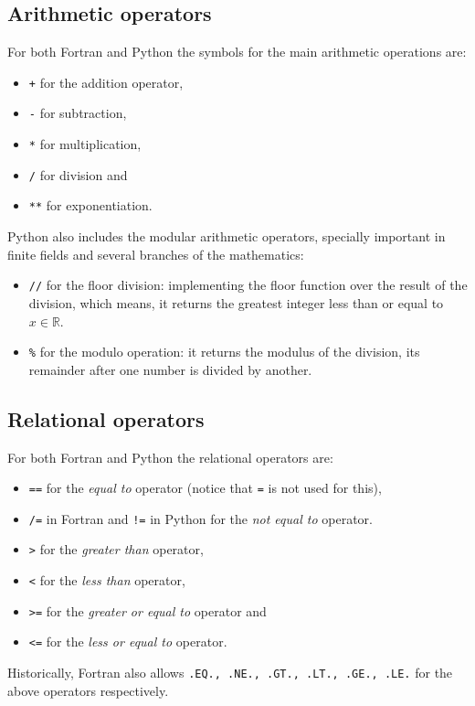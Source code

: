         \subsection*{Arithmetic operators}
        
        For both Fortran and Python the symbols for the main arithmetic operations are:
        \vspace{-0.5cm}
        \begin{itemize}[noitemsep]
            \item \texttt{+} for the addition operator, 
            \item \texttt{-} for subtraction,
            \item \texttt{*} for multiplication,
            \item \texttt{/} for division and
            \item \texttt{**} for exponentiation.
        \end{itemize}
        Python also includes the modular arithmetic operators, specially important in finite fields and several branches of the mathematics:
        \vspace{-0.5cm}
        \begin{itemize}[noitemsep]
            \item \texttt{//} for the floor division: implementing the floor function over the result of the division, which means, it returns the greatest integer less than or equal to $x\in\mathbb{R}$.
            \item \texttt{\%} for the modulo operation: it returns the modulus of the division, its remainder after one number is divided by another.
        \end{itemize}
        
        
        
        \subsection*{Relational operators}
        
        For both Fortran and Python the relational operators are:
        \vspace{-0.5cm}
        \begin{itemize}[noitemsep]
            \item \texttt{==} for the \textit{equal to} operator (notice that \texttt{=} is not used for this), 
            \item \texttt{/=} in Fortran and \texttt{!=} in Python for the \textit{not equal to} operator.
            \item \texttt{>} for the \textit{greater than} operator,
            \item \texttt{<} for the \textit{less than} operator,
            \item \texttt{>=} for the \textit{greater or equal to} operator and
            \item \texttt{<=} for the \textit{less or equal to} operator.
        \end{itemize}
        Historically, Fortran also allows \texttt{.EQ., .NE., .GT., .LT., .GE., .LE.} for the above operators respectively. 
    
